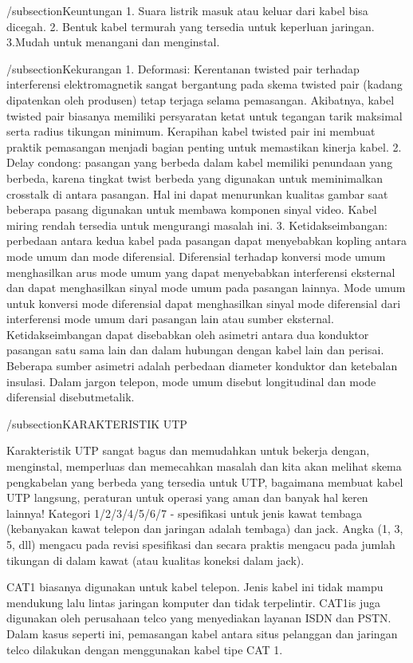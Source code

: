 

/subsection{Keuntungan}
1. Suara listrik masuk atau keluar dari kabel bisa dicegah.
2. Bentuk kabel termurah yang tersedia untuk keperluan jaringan.
3.Mudah untuk menangani dan menginstal.

/subsection{Kekurangan}
1. Deformasi: Kerentanan twisted pair terhadap interferensi elektromagnetik sangat bergantung pada skema twisted pair (kadang dipatenkan oleh produsen) tetap terjaga selama pemasangan. Akibatnya, kabel twisted pair biasanya memiliki persyaratan ketat untuk tegangan tarik maksimal serta radius tikungan minimum. Kerapihan kabel twisted pair ini membuat praktik pemasangan menjadi bagian penting untuk memastikan kinerja kabel.
2. Delay condong: pasangan yang berbeda dalam kabel memiliki penundaan yang berbeda, karena tingkat twist berbeda yang digunakan untuk meminimalkan crosstalk di antara pasangan. Hal ini dapat menurunkan kualitas gambar saat beberapa pasang digunakan untuk membawa komponen sinyal video. Kabel miring rendah tersedia untuk mengurangi masalah ini.
3. Ketidakseimbangan: perbedaan antara kedua kabel pada pasangan dapat menyebabkan kopling antara mode umum dan mode diferensial. Diferensial terhadap konversi mode umum menghasilkan arus mode umum yang dapat menyebabkan interferensi eksternal dan dapat menghasilkan sinyal mode umum pada pasangan lainnya. Mode umum untuk konversi mode diferensial dapat menghasilkan sinyal mode diferensial dari interferensi mode umum dari pasangan lain atau sumber eksternal. Ketidakseimbangan dapat disebabkan oleh asimetri antara dua konduktor pasangan satu sama lain dan dalam hubungan dengan kabel lain dan perisai. Beberapa sumber asimetri adalah perbedaan diameter konduktor dan ketebalan insulasi. Dalam jargon telepon, mode umum disebut longitudinal dan mode diferensial disebutmetalik.

/subsection{KARAKTERISTIK UTP}

Karakteristik UTP sangat bagus dan memudahkan untuk bekerja dengan, menginstal, memperluas dan memecahkan masalah dan kita akan melihat skema pengkabelan yang berbeda yang tersedia untuk UTP, bagaimana membuat kabel UTP langsung, peraturan untuk operasi yang aman dan banyak hal keren lainnya!
Kategori 1/2/3/4/5/6/7 - spesifikasi untuk jenis kawat tembaga (kebanyakan kawat telepon dan jaringan adalah tembaga) dan jack. Angka (1, 3, 5, dll) mengacu pada revisi spesifikasi dan secara praktis mengacu pada jumlah tikungan di dalam kawat (atau kualitas koneksi dalam jack).

CAT1 biasanya digunakan untuk kabel telepon. Jenis kabel ini tidak mampu mendukung lalu lintas jaringan komputer dan tidak terpelintir. CAT1is juga digunakan oleh perusahaan telco yang menyediakan layanan ISDN dan PSTN. Dalam kasus seperti ini, pemasangan kabel antara situs pelanggan dan jaringan telco dilakukan dengan menggunakan kabel tipe CAT 1.

